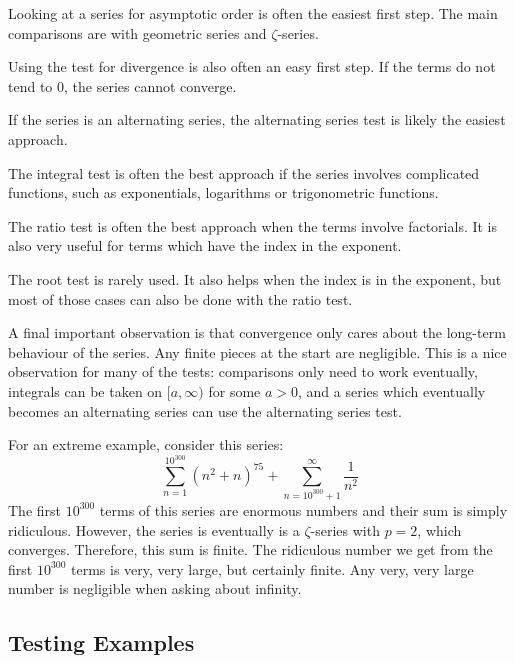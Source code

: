 \documentclass[fleqn]{report}
\begin{document}
\begin{smallitemize}
\item Looking at a series for asymptotic order is often the
easiest first step. The main comparisons are with geometric
series and $\zeta$-series. 
\item Using the test for divergence is also often an easy
first step. If the terms do not tend to $0$, the series
cannot converge.
\item If the series is an alternating series, the alternating
series test is likely the easiest approach.
\item The integral test is often the best approach if the
series involves complicated functions, such as exponentials,
logarithms or trigonometric functions.
\item The ratio test is often the best approach when the terms
involve factorials. It is also very useful for terms which
have the index in the exponent. 
\item The root test is rarely used. It also helps when the
index is in the exponent, but most of those cases can also be
done with the ratio test. 
\end{smallitemize}
A final important observation is that convergence only cares
about the long-term behaviour of the series. Any finite
pieces at the start are negligible. This is a nice
observation for many of the tests: comparisons only need to
work eventually, integrals can be taken on $[a,\infty)$ for
some $a>0$, and a series which eventually becomes an
alternating series can use the alternating series test. 

\begin{example}
For an extreme example, consider this series:
\begin{equation*}
\sum_{n=1}^{10^{300}} (n^2 +n)^{75} + \sum_{n=10^{300} + 1}^\infty
\frac{1}{n^2} 
\end{equation*}
The first $10^{300}$ terms of this series are enormous numbers
and their sum is simply ridiculous. However, the series is
eventually is a $\zeta$-series with $p=2$, which converges.
Therefore, this sum is finite. The ridiculous number we get
from the first $10^{300}$ terms is very, very large, but
certainly finite. Any very, very large number is negligible
when asking about infinity. 
\end{example}

\subsection{Testing Examples}
\label{testing-examples}
\end{document}
